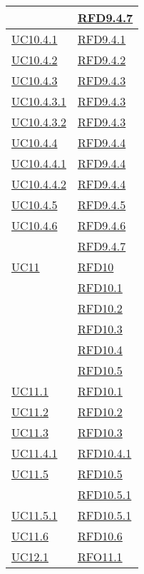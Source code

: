 \begin{longtable}{|>{\centering}m{5cm}|m{5cm}<{\centering}|}
& \hyperlink{RFD9.4.7}{RFD9.4.7}\\ \hline
\hyperref[UC10.4.1]{UC10.4.1} & \hyperlink{RFD9.4.1}{RFD9.4.1}\\ \hline
\hyperref[UC10.4.2]{UC10.4.2} & \hyperlink{RFD9.4.2}{RFD9.4.2}\\ \hline
\hyperref[UC10.4.3]{UC10.4.3} & \hyperlink{RFD9.4.3}{RFD9.4.3}\\ \hline
\hyperref[UC10.4.3.1]{UC10.4.3.1} & \hyperlink{RFD9.4.3}{RFD9.4.3}\\ \hline
\hyperref[UC10.4.3.2]{UC10.4.3.2} & \hyperlink{RFD9.4.3}{RFD9.4.3}\\ \hline
\hyperref[UC10.4.4]{UC10.4.4} & \hyperlink{RFD9.4.4}{RFD9.4.4}\\ \hline
\hyperref[UC10.4.4.1]{UC10.4.4.1} & \hyperlink{RFD9.4.4}{RFD9.4.4}\\ \hline
\hyperref[UC10.4.4.2]{UC10.4.4.2} & \hyperlink{RFD9.4.4}{RFD9.4.4}\\ \hline
\hyperref[UC10.4.5]{UC10.4.5} & \hyperlink{RFD9.4.5}{RFD9.4.5}\\ \hline
\hyperref[UC10.4.6]{UC10.4.6} & \hyperlink{RFD9.4.6}{RFD9.4.6}\\
& \hyperlink{RFD9.4.7}{RFD9.4.7}\\ \hline
\hyperref[UC11]{UC11} & \hyperlink{RFD10}{RFD10}\\
& \hyperlink{RFD10.1}{RFD10.1}\\
& \hyperlink{RFD10.2}{RFD10.2}\\
& \hyperlink{RFD10.3}{RFD10.3}\\
& \hyperlink{RFD10.4}{RFD10.4}\\
& \hyperlink{RFD10.5}{RFD10.5}\\ \hline
\hyperref[UC11.1]{UC11.1} & \hyperlink{RFD10.1}{RFD10.1}\\ \hline
\hyperref[UC11.2]{UC11.2} & \hyperlink{RFD10.2}{RFD10.2}\\ \hline
\hyperref[UC11.3]{UC11.3} & \hyperlink{RFD10.3}{RFD10.3}\\ \hline
\hyperref[UC11.4.1]{UC11.4.1} & \hyperlink{RFD10.4.1}{RFD10.4.1}\\ \hline
\hyperref[UC11.5]{UC11.5} & \hyperlink{RFD10.5}{RFD10.5}\\
& \hyperlink{RFD10.5.1}{RFD10.5.1}\\ \hline
\hyperref[UC11.5.1]{UC11.5.1} & \hyperlink{RFD10.5.1}{RFD10.5.1}\\ \hline
\hyperref[UC11.6]{UC11.6} & \hyperlink{RFD10.6}{RFD10.6}\\ \hline
\hyperref[UC12.1]{UC12.1} & \hyperlink{RFO11.1}{RFO11.1}\\ \hline

\end{longtable}
